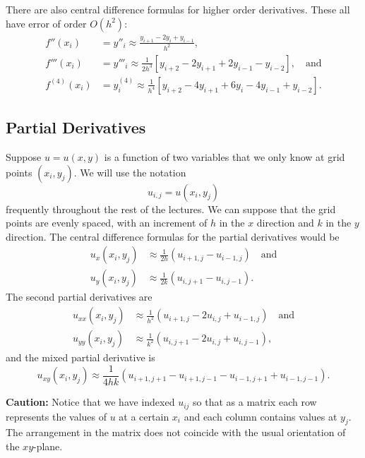 There are also central difference formulas for higher order
derivatives. These all have error of order $O(h^2)$:
\begin{align*}
f''(x_i) &=
y''_i \approx \frac{y_{i+1} - 2 y_i + y_{i-1}}{h^2},\\
f'''(x_i) &=
y'''_i \approx \frac{1}{2 h^3} \left[y_{i+2} - 2y_{i+1} + 2y_{i-1} -
y_{i-2} \right] ,\quad\text{and}\\
f^{(4)}(x_i) &= y^{(4)}_i \approx \frac{1}{h^4}
\left[y_{i+2} - 4y_{i+1} + 6y_i - 4y_{i-1} + y_{i-2} \right]
.
\end{align*}


\subsection*{Partial Derivatives}

Suppose $u = u(x,y)$ is a function of two variables that we
only know at grid points $(x_i,y_j)$. We will use the notation
$$
      u_{i,j} = u(x_i,y_j)
$$
frequently throughout the rest of the lectures.
We can suppose that the grid points are evenly spaced, with
an increment of $h$ in the $x$ direction and $k$ in the $y$ direction.
The central difference formulas for the partial derivatives
would be
\begin{align*}
u_x(x_i,y_j) &\approx \frac{1}{2h}
                      \left( u_{i+1,j} - u_{i-1,j} \right)
\quad\text{and}\\
u_y(x_i,y_j) &\approx \frac{1}{2k}
                      \left( u_{i,j+1} - u_{i,j-1} \right).
\end{align*}
The second partial derivatives are
\begin{align*}
u_{xx}(x_i,y_j) &\approx \frac{1}{h^2}
                    \left( u_{i+1,j} -2u_{i,j} + u_{i-1,j} \right)
\quad\text{and}\\
u_{yy}(x_i,y_j) &\approx \frac{1}{k^2}
                    \left( u_{i,j+1} -2u_{i,j} + u_{i,j-1} \right) ,
\end{align*}
and the mixed partial derivative is
$$
    u_{xy}(x_i,y_j) \approx \frac{1}{4hk}
  \left( u_{i+1,j+1} - u_{i+1,j-1} - u_{i-1,j+1} + u_{i-1,j-1} \right) .
$$

{\bf Caution:} Notice that we have indexed $u_{ij}$ so that as a matrix
each row represents the values of $u$ at a certain $x_i$ and each column
contains values at $y_j$. The arrangement in the matrix does not
coincide with the usual orientation of the $xy$-plane.

